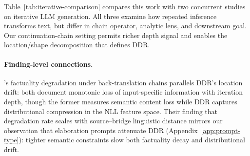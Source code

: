 \begin{table}[!t]
\centering
\small
\caption{Comparison with concurrent iterative-generation studies. All three examine how repeated LLM inference transforms text, but differ in chain operator, analytic lens, and downstream goal.}
\label{tab:iterative-comparison}
\end{table}

Table~\ref{tab:iterative-comparison} compares this work with two concurrent studies on iterative LLM generation.
All three examine how repeated inference transforms text, but differ in chain operator, analytic lens, and downstream goal.
Our continuation-chain setting permits richer depth signal and enables the location/shape decomposition that defines DDR.

\paragraph{Finding-level connections.}
\citet{broken_telephone}'s factuality degradation under back-translation chains parallels DDR's location drift: both document monotonic loss of input-specific information with iteration depth, though the former measures semantic content loss while DDR captures distributional compression in the NLL feature space.
Their finding that degradation rate scales with source--bridge linguistic distance mirrors our observation that elaboration prompts attenuate DDR (Appendix~\ref{app:prompt-type}): tighter semantic constraints slow both factuality decay and distributional drift.

